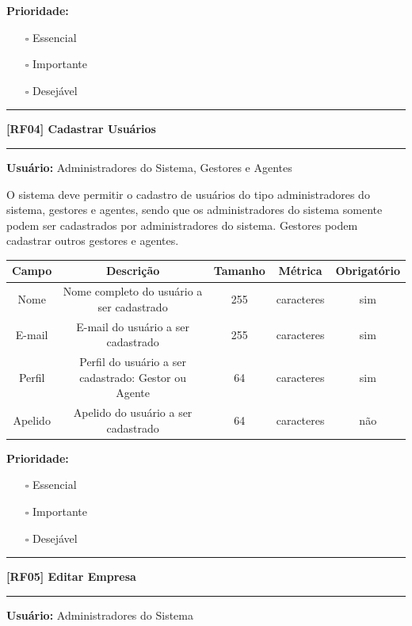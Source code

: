 	\textbf{Prioridade: }\begin{itemize}
		\item[\hspace{1cm}\rlap{\raisebox{0.2ex}{\hspace{0.4ex}\scriptsize \ding{56}}}$\square$]
		Essencial
		\item[\hspace{1cm}$\square$]
		Importante
		\item[\hspace{1cm}$\square$]
		Desejável
	\end{itemize}
	
	\begin{center}
		\noindent\rule{\textwidth}{0.4pt}
		\textbf{[RF04] Cadastrar Usuários}
		\noindent\rule{\textwidth}{0.4pt}
	\end{center}
	\textbf{Usuário:} Administradores do Sistema, Gestores e Agentes
	
	O sistema deve permitir o cadastro de usuários do tipo administradores do sistema, gestores e agentes, sendo que os administradores do 
	sistema somente podem ser cadastrados por administradores do sistema. Gestores podem cadastrar outros gestores e agentes.
	
	\begin{center}
		\begin{adjustbox}{width=\textwidth}      \begin{tabular}{ |c|c|c|c|c| } 
			\hline
			\rowcolor{lightgray} Campo & Descrição & Tamanho & Métrica & Obrigatório \\
			\hline
			Nome & Nome completo do usuário a ser cadastrado & 255 & caracteres & sim \\ 
			\hline
			E-mail & E-mail do usuário a ser cadastrado & 255 & caracteres & sim \\ 
			\hline
			Perfil & Perfil do usuário a ser cadastrado: Gestor ou Agente & 64 & caracteres & sim \\ 
			\hline
			Apelido & Apelido do usuário a ser cadastrado & 64 & caracteres & não \\
			\hline
		\end{tabular}    \end{adjustbox}
	\end{center}
	
	\textbf{Prioridade: }\begin{itemize}
		\item[\hspace{1cm}\rlap{\raisebox{0.2ex}{\hspace{0.4ex}\scriptsize \ding{56}}}$\square$]
		Essencial
		\item[\hspace{1cm}$\square$]
		Importante
		\item[\hspace{1cm}$\square$]
		Desejável
	\end{itemize}
	\begin{center}
		\noindent\rule{\textwidth}{0.4pt}
		\textbf{[RF05] Editar Empresa}
		\noindent\rule{\textwidth}{0.4pt}
	\end{center}
	\textbf{Usuário:} Administradores do Sistema
	
